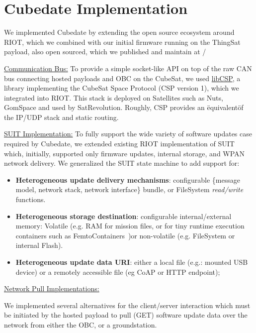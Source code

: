 \section{Cubedate Implementation}
\label{sec:implementation}

We implemented Cubedate by extending the open source ecosystem around RIOT, which we combined with
our initial firmware running on the ThingSat payload, also open sourced, which we published and
maintain at \cite*{git:cubedate-repo}/

\underline{Communication Bus:}
To provide a simple socket-like API on top of the raw CAN bus connecting hosted
payloads and OBC on the CubeSat, we used \href{https://github.com/libcsp/libcsp}{libCSP},
a library implementing the CubeSat Space Protocol (CSP version 1), which we integrated into RIOT.
This stack is deployed on Satellites such as Nuts\cite{birkeland2014nutsoverview}, GomSpace
and used by SatRevolution. Roughly, CSP provides an \"equivalent\" of the IP/UDP stack
and static routing.

\underline{SUIT Implementation:}
To fully support the wide variety of software updates case required by Cubedate, we
extended existing RIOT implementation of SUIT~\cite{zandberg2019secure} which,
initially, supported only firmware updates, internal storage, and WPAN network delivery.
We generalized the SUIT state machine to add support for:

\begin{itemize}
    \item \textbf{Heterogeneous update delivery mechanisms}: configurable \{message model,
    network stack, network interface\} bundle, or FileSystem \textit{read/write} functions.
    \item \textbf{Heterogeneous storage destination}: configurable internal/external memory:
    Volatile (e.g. RAM for mission files, or for tiny runtime execution containers such as
    FemtoContainers~\cite{zandberg2021femto})or non-volatile (e.g. FileSystem or internal Flash).
    \item \textbf{Heterogeneous update data URI}: either a local file (e.g.: mounted USB device)
    or a remotely accessible file (eg CoAP or HTTP endpoint);
\end{itemize}

\underline{Network Pull Implementations:}

\iffalse
We implemented several alternatives for the client/server interaction which
must be initiated by the hosted payload to pull (GET) software update data over the
network from either the OBC, or a groundstation.

